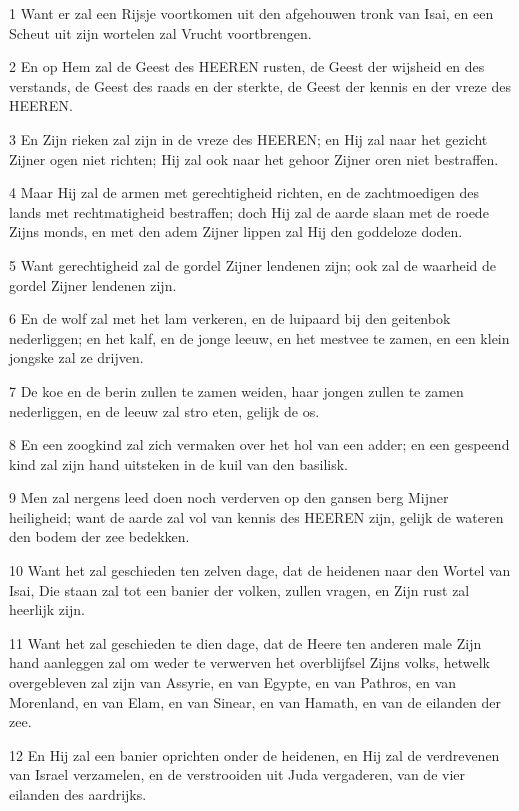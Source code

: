 \par 1 Want er zal een Rijsje voortkomen uit den afgehouwen tronk van Isai, en een Scheut uit zijn wortelen zal Vrucht voortbrengen.
\par 2 En op Hem zal de Geest des HEEREN rusten, de Geest der wijsheid en des verstands, de Geest des raads en der sterkte, de Geest der kennis en der vreze des HEEREN.
\par 3 En Zijn rieken zal zijn in de vreze des HEEREN; en Hij zal naar het gezicht Zijner ogen niet richten; Hij zal ook naar het gehoor Zijner oren niet bestraffen.
\par 4 Maar Hij zal de armen met gerechtigheid richten, en de zachtmoedigen des lands met rechtmatigheid bestraffen; doch Hij zal de aarde slaan met de roede Zijns monds, en met den adem Zijner lippen zal Hij den goddeloze doden.
\par 5 Want gerechtigheid zal de gordel Zijner lendenen zijn; ook zal de waarheid de gordel Zijner lendenen zijn.
\par 6 En de wolf zal met het lam verkeren, en de luipaard bij den geitenbok nederliggen; en het kalf, en de jonge leeuw, en het mestvee te zamen, en een klein jongske zal ze drijven.
\par 7 De koe en de berin zullen te zamen weiden, haar jongen zullen te zamen nederliggen, en de leeuw zal stro eten, gelijk de os.
\par 8 En een zoogkind zal zich vermaken over het hol van een adder; en een gespeend kind zal zijn hand uitsteken in de kuil van den basilisk.
\par 9 Men zal nergens leed doen noch verderven op den gansen berg Mijner heiligheid; want de aarde zal vol van kennis des HEEREN zijn, gelijk de wateren den bodem der zee bedekken.
\par 10 Want het zal geschieden ten zelven dage, dat de heidenen naar den Wortel van Isai, Die staan zal tot een banier der volken, zullen vragen, en Zijn rust zal heerlijk zijn.
\par 11 Want het zal geschieden te dien dage, dat de Heere ten anderen male Zijn hand aanleggen zal om weder te verwerven het overblijfsel Zijns volks, hetwelk overgebleven zal zijn van Assyrie, en van Egypte, en van Pathros, en van Morenland, en van Elam, en van Sinear, en van Hamath, en van de eilanden der zee.
\par 12 En Hij zal een banier oprichten onder de heidenen, en Hij zal de verdrevenen van Israel verzamelen, en de verstrooiden uit Juda vergaderen, van de vier eilanden des aardrijks.
